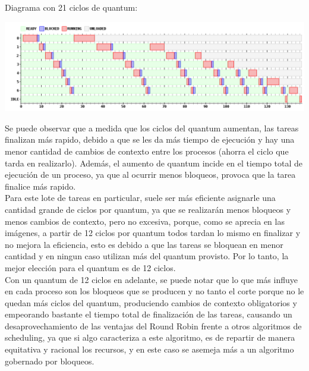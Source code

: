 \par Diagrama con 21 ciclos de quantum:
\begin {center}
\includegraphics[width=16cm]{../simusched/outputs/ej7/rr-ej7-1-21.png}
\end {center}

Se puede observar que a medida que los ciclos del quantum aumentan, las tareas finalizan más rapido, debido a que se les da más tiempo de ejecución y hay una menor cantidad de cambios de contexto entre los procesos (ahorra el ciclo que tarda en realizarlo). Además, el aumento de quantum incide en el tiempo total de ejecución de un proceso, ya que al ocurrir menos bloqueos, provoca que la tarea finalice más rapido.
\\
Para este lote de tareas en particular, suele ser más eficiente asignarle una cantidad grande de ciclos por quantum,  ya que se realizarán menos bloqueos y menos cambios de contexto, pero no excesiva, porque, como se aprecia en las imágenes, a partir de 12 ciclos por quantum todos tardan lo mismo en finalizar y no mejora la eficiencia, esto es debido a que las tareas se bloquean en menor cantidad y en ningun caso utilizan más del quantum provisto. Por lo tanto, la mejor elección para el quantum es de 12 ciclos.
\\
Con un quantum de 12 ciclos en adelante, se puede notar que lo que más influye en cada proceso son los bloqueos que se producen y no tanto el corte porque no le quedan más ciclos del quantum, produciendo cambios de contexto obligatorios y empeorando bastante el tiempo total de finalización de las tareas, causando un desaprovechamiento de las ventajas del Round Robin frente a otros algoritmos de scheduling, ya que si algo caracteriza a este algoritmo, es de repartir de manera equitativa y racional los recursos, y en este caso se asemeja más a un algoritmo gobernado por bloqueos.



